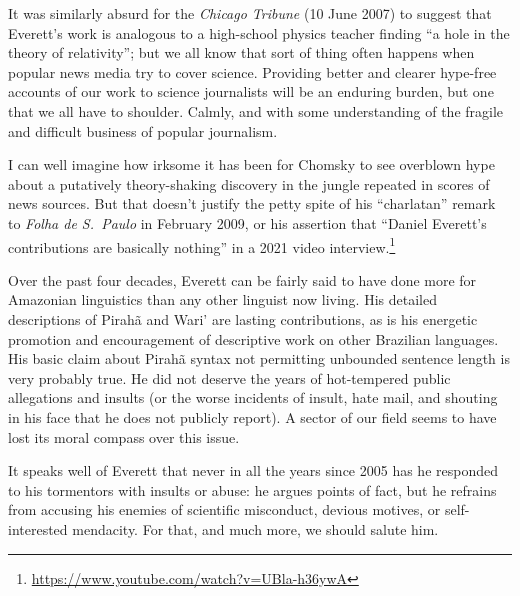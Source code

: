 \documentclass[output=paper,colorlinks,citecolor=brown
]{langscibook}
\begin{document}
It was similarly absurd for the
\textit{Chicago Tribune} (10 June 2007)
to suggest that Everett's work is analogous to a high-school physics
teacher finding ``a hole in the theory of relativity''; but we all know
that sort of thing often happens when popular news media try to cover
science. Providing better and clearer hype-free accounts of our work
to science journalists will be an enduring burden, but one that we
all have to shoulder. Calmly, and with some understanding of the
fragile and difficult business of popular journalism.

I can well imagine how irksome it has been for Chomsky to see overblown
hype about a putatively theory-shaking discovery in the jungle repeated
in scores of news sources. But that doesn't justify the petty spite of
his ``charlatan'' remark to \textit{Folha de S.~Paulo} in February 2009,
or his assertion that ``Daniel Everett's contributions are basically
nothing'' in a 2021 video interview.\footnote{\label{basicallynothing}%
   \url{https://www.youtube.com/watch?v=UBla-h36ywA}}

Over the past four decades, Everett can be fairly said to have done
more for Amazonian linguistics than any other linguist now living.
His detailed descriptions of Pirah{\~a} and Wari' are lasting
contributions, as is his energetic promotion and encouragement of
descriptive work on other Brazilian languages. His basic claim about
Pirah{\~a} syntax not permitting unbounded sentence length is very
probably true. He did not deserve the years of hot-tempered public
allegations and insults (or the worse incidents of insult, hate mail,
and shouting in his face that he does not publicly report). A sector
of our field seems to have lost its moral compass over this issue.

It speaks well of Everett that never in all the years since 2005 has
he responded to his tormentors with insults or abuse: he argues points
of fact, but he refrains from accusing his enemies of scientific
misconduct, devious motives, or self-interested mendacity. For that,
and much more, we should salute him.
\end{document}
